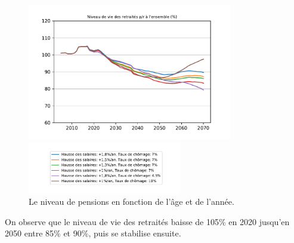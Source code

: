 \documentclass[10pt]{article}
\begin{document}
\begin{figure}
\begin{center}
\includegraphics[width=0.8\textwidth]{Simulation-RNV.pdf}

\includegraphics[width=0.6\textwidth]{Simulation-legende.pdf}
\end{center}

\caption{Le niveau de pensions en fonction de l'âge et de l'année.}
\label{fig-simulation-RNV-vs-pensions}
\end{figure}

On observe que le niveau de vie des retraités 
baisse de 105\% en 2020 jusqu'en 2050 entre 85\% et 90\%, puis se stabilise ensuite. 
\end{document}
